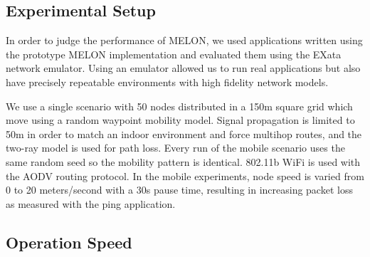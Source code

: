 \documentclass[lnicst]{svmultln}
\begin{document}
\subsection{Experimental Setup}

In order to judge the performance of MELON, we used applications written using the prototype MELON implementation and evaluated them using the EXata network emulator\cite{exata}. Using an emulator allowed us to run real applications but also have precisely repeatable environments with high fidelity network models.

We use a single scenario with 50 nodes distributed in a 150m square grid which move using a random waypoint mobility model. Signal propagation is limited to 50m in order to match an indoor environment and force multihop routes, and the two-ray model is used for path loss. Every run of the mobile scenario uses the same random seed so the mobility pattern is identical. 802.11b WiFi is used with the AODV\cite{aodv} routing protocol. In the mobile experiments, node speed is varied from 0 to 20 meters/second with a 30s pause time, resulting in increasing packet loss as measured with the ping application.

\subsection{Operation Speed}
\end{document}
